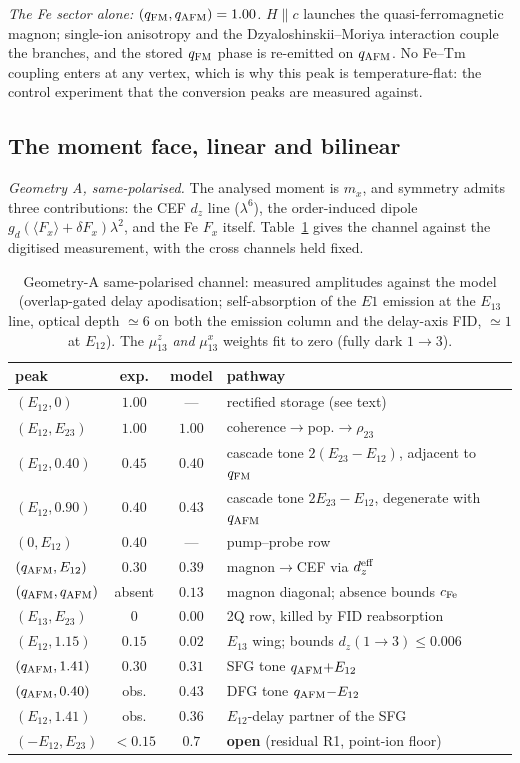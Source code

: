 \documentclass[aps,prb,twocolumn,superscriptaddress,longbibliography]{revtex4-2}
\newcommand{\qafm}{q_{\rm AFM}}
\newcommand{\qfm}{q_{\rm FM}}
\begin{document}
\emph{The Fe sector alone: $(\qfm,\qafm)=1.00$.}  $H\!\parallel\!c$
launches the quasi-ferromagnetic magnon; single-ion anisotropy and
the Dzyaloshinskii--Moriya interaction couple the branches, and the
stored $\qfm$ phase is re-emitted on $\qafm$.  No Fe--Tm coupling
enters at any vertex, which is why this peak is temperature-flat: the
control experiment that the conversion peaks are measured against.

\subsection{The moment face, linear and bilinear}

\emph{Geometry A, same-polarised.}  The analysed moment is $m_x$, and
symmetry admits three contributions: the CEF $d_z$ line
($\lambda^6$), the order-induced dipole
$g_d(\langle F_x\rangle+\delta F_x)\lambda^2$, and the Fe $F_x$
itself.  Table~\ref{tab:samepol} gives the channel against the
digitised measurement, with the cross channels held fixed.

\begin{table}[b]
\caption{Geometry-A same-polarised channel: measured amplitudes against
the model (overlap-gated delay apodisation; self-absorption of the
$E1$ emission at the $E_{13}$ line, optical depth $\simeq6$ on both
the emission column and the delay-axis FID, $\simeq1$ at $E_{12}$).
The $\mu^z_{13}$ \emph{and} $\mu^x_{13}$ weights fit to zero (fully
dark $1\!\to\!3$).}
\label{tab:samepol}
\centering\small
\renewcommand{\arraystretch}{1.25}
\begin{tabular}{lccl}
\hline
peak & exp. & model & pathway\\
\hline
$(E_{12},0)$ & $1.00$ & --- & rectified storage (see text)\\
$(E_{12},E_{23})$ & $1.00$ & $1.00$ & coherence$\to$pop.$\to\rho_{23}$\\
$(E_{12},0.40)$ & $0.45$ & $0.40$ & cascade tone $2(E_{23}{-}E_{12})$, adjacent to $\qfm$\\
$(E_{12},0.90)$ & $0.40$ & $0.43$ & cascade tone $2E_{23}{-}E_{12}$, degenerate with $\qafm$\\
$(0,E_{12})$ & $0.40$ & --- & pump--probe row\\
$(\qafm,E_{12})$ & $0.30$ & $0.39$ & magnon$\to$CEF via $d_z^{\rm eff}$\\
$(\qafm,\qafm)$ & absent & $0.13$ & magnon diagonal; absence bounds $c_{\rm Fe}$\\
$(E_{13},E_{23})$ & $0$ & $0.00$ & 2Q row, killed by FID reabsorption\\
$(E_{12},1.15)$ & $0.15$ & $0.02$ & $E_{13}$ wing; bounds $d_z(1\to3)\leq0.006$\\
$(\qafm,1.41)$ & $0.30$ & $0.31$ & SFG tone $\qafm{+}E_{12}$\\
$(\qafm,0.40)$ & obs. & $0.43$ & DFG tone $\qafm{-}E_{12}$\\
$(E_{12},1.41)$ & obs. & $0.36$ & $E_{12}$-delay partner of the SFG\\
$(-E_{12},E_{23})$ & $<0.15$ & $0.7$ & \textbf{open} (residual R1, point-ion floor)\\
\hline
\end{tabular}
\end{table}
\end{document}
